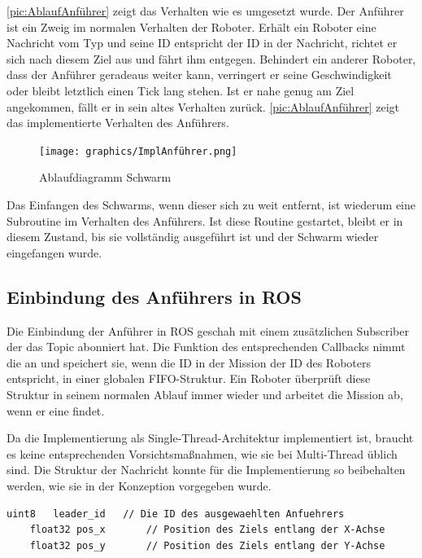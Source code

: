 
\autoref{pic:AblaufAnführer} zeigt das Verhalten wie es umgesetzt wurde.
Der Anführer ist ein Zweig im normalen Verhalten der Roboter. Erhält ein Roboter eine Nachricht vom Typ  und seine ID entspricht der ID in der Nachricht, richtet er sich nach diesem Ziel aus und fährt ihm entgegen. Behindert ein anderer Roboter, dass der Anführer geradeaus weiter kann, verringert er seine Geschwindigkeit oder bleibt letztlich einen Tick lang stehen. Ist er nahe genug am Ziel angekommen, fällt er in sein altes Verhalten zurück. \autoref{pic:AblaufAnführer} zeigt das implementierte Verhalten des Anführers.

\begin{figure}[h]
	\centering
	\texttt{[image: graphics/ImplAnführer.png]}
	\caption{Ablaufdiagramm Schwarm}
	\label{pic:AblaufAnführer}
\end{figure}

Das Einfangen des Schwarms, wenn dieser sich zu weit entfernt, ist wiederum eine Subroutine im Verhalten des Anführers. Ist diese Routine gestartet, bleibt er in diesem Zustand, bis sie vollständig ausgeführt ist und der Schwarm wieder eingefangen wurde.

\subsection*{Einbindung des Anführers in ROS}

Die Einbindung der Anführer in \ac{ROS} geschah mit einem zusätzlichen Subscriber der das Topic  abonniert hat. Die Funktion des entsprechenden Callbacks nimmt die  an und speichert sie, wenn die ID in der Mission der ID des Roboters entspricht, in einer globalen FIFO-Struktur. Ein Roboter überprüft diese Struktur in seinem normalen Ablauf immer wieder und arbeitet die Mission ab, wenn er eine findet.

Da die Implementierung als Single-Thread-Architektur implementiert ist, braucht es keine entsprechenden Vorsichtsmaßnahmen, wie sie bei Multi-Thread üblich sind.
Die Struktur der Nachricht konnte für die Implementierung so beibehalten werden, wie sie in der Konzeption vorgegeben wurde.

\begin{lstlisting}[style=ros, title=Nachrichten-Typ: New\_Mission]
	uint8	leader_id	// Die ID des ausgewaehlten Anfuehrers
	float32 pos_x		// Position des Ziels entlang der X-Achse
	float32 pos_y		// Position des Ziels entlang der Y-Achse
\end{lstlisting}










